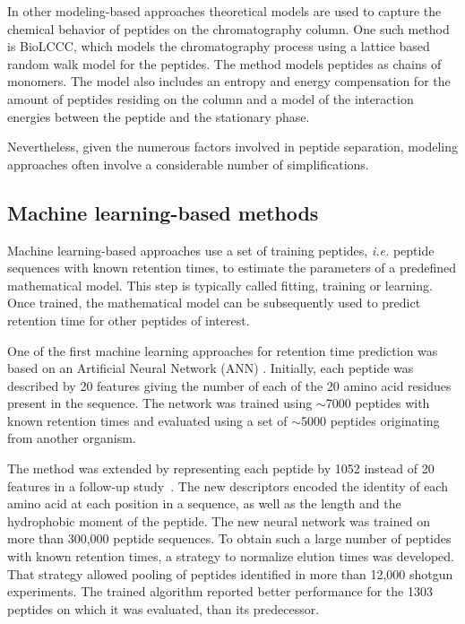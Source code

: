 \documentclass[a4paper]{article}
\begin{document}
In other modeling-based approaches theoretical models are used to
capture the chemical behavior of peptides on the chromatography
column. One such method is BioLCCC, which models the chromatography
process using a lattice based random walk model for the peptides. The
method models peptides as chains of monomers. The model also includes
an entropy and energy compensation for the amount of peptides residing
on the column and a model of the interaction energies between the
peptide and the stationary phase.

Nevertheless, given the numerous factors involved in peptide
separation, modeling approaches often involve a considerable number of
simplifications.
 
\subsection{Machine learning-based methods}
\label{sec:ML}

Machine learning-based approaches use a set of training peptides, {\em
  i.e.} peptide sequences with known retention times, to estimate the
parameters of a predefined mathematical model. This step is typically
called fitting, training or learning. Once trained, the mathematical
model can be subsequently used to predict retention time for other
peptides of interest.


One of the first machine learning approaches for retention time
prediction was based on an Artificial Neural Network
(ANN) \cite{petritis2003}. Initially, each peptide was described by 20
features giving the number of each of the 20 amino acid residues
present in the sequence. The network was trained using $\sim$7000
peptides with known retention times and evaluated using a set of
$\sim$5000 peptides originating from another organism. 

The method was extended by representing each peptide by 1052 instead
of 20 features in a follow-up study~\cite{petritis2006improved}. The
new descriptors encoded the identity of each amino acid at each
position in a sequence, as well as the length and the hydrophobic
moment of the peptide. The new neural network was trained on more than
300,000 peptide sequences. To obtain such a large number of peptides
with known retention times, a strategy to normalize elution times was
developed. That strategy allowed pooling of peptides identified in
more than 12,000 shotgun experiments. The trained algorithm reported
better performance for the 1303 peptides on which it was evaluated,
than its predecessor.
\end{document}
